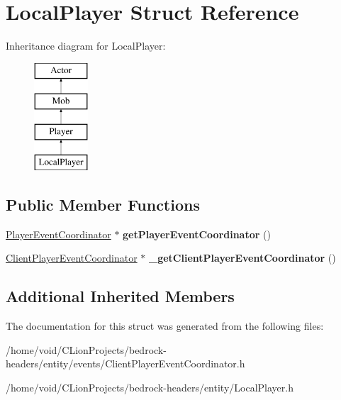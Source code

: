 \hypertarget{class_local_player}{}\section{Local\+Player Struct Reference}
\label{class_local_player}
Inheritance diagram for Local\+Player\+:\begin{figure}[H]
\begin{center}
\leavevmode
\includegraphics[height=4.000000cm]{class_local_player}
\end{center}
\end{figure}
\subsection*{Public Member Functions}
\begin{DoxyCompactItemize}
\item 
\mbox{\label{class_local_player_a2d7d7a2333a90c516d0e5f857db94c2b}} 
\mbox{\hyperlink{struct_player_event_coordinator}{Player\+Event\+Coordinator}} $\ast$ {\bfseries get\+Player\+Event\+Coordinator} ()
\item 
\mbox{\label{class_local_player_afdf216808992191c67170cc4946206e6}} 
\mbox{\hyperlink{struct_client_player_event_coordinator}{Client\+Player\+Event\+Coordinator}} $\ast$ {\bfseries \+\_\+get\+Client\+Player\+Event\+Coordinator} ()
\end{DoxyCompactItemize}
\subsection*{Additional Inherited Members}


The documentation for this struct was generated from the following files\+:\begin{DoxyCompactItemize}
\item 
/home/void/\+C\+Lion\+Projects/bedrock-\/headers/entity/events/Client\+Player\+Event\+Coordinator.\+h\item 
/home/void/\+C\+Lion\+Projects/bedrock-\/headers/entity/Local\+Player.\+h\end{DoxyCompactItemize}
